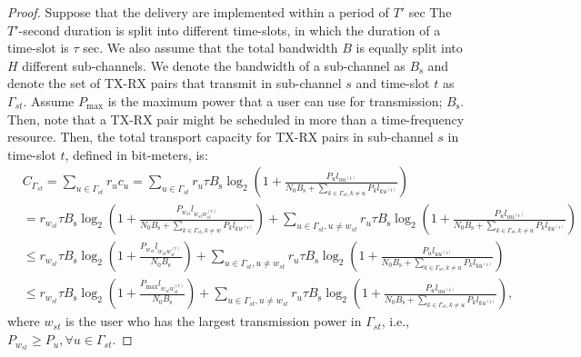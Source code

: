 \documentclass[journal,draftclsnofoot,onecolumn,12pt,twoside]{IEEEtran}
\begin{document}
\begin{proof}
Suppose that the delivery are implemented within a period of $T'$ sec The $T'$-second duration is split into different time-slots, in which the duration of a time-slot is $\tau$ sec. We also assume that the total bandwidth $B$ is equally split into $H$ different sub-channels. We denote the bandwidth of a sub-channel as $B_{\text{s}}$ and denote the set of TX-RX pairs that transmit in sub-channel $s$ and time-slot $t$ as $\Gamma_{st}$. Assume $P_{\text{max}}$ is the maximum power that a user can use for transmission; $B_{\text{s}}$. Then, note that a TX-RX pair might be scheduled in more than a time-frequency resource. Then, the total transport capacity for TX-RX pairs in sub-channel $s$ in time-slot $t$, defined in bit-meters, is:
\begin{equation}
\begin{aligned}\label{eq:g_model_subTC}
&C_{\Gamma_{st}}=\sum_{u\in\Gamma_{st}}r_uc_u=\sum_{u\in\Gamma_{st}}r_u\tau B_{\text{s}}\log_2\left(1+\frac{P_ul_{uu^{(\text{r})}}}{N_0B_{\text{s}}+\sum_{k\in\Gamma_{st},k\neq u}P_kl_{ku^{(\text{r})}}}\right)\\
&=r_{w_{st}}\tau B_{\text{s}}\log_2\left(1+\frac{P_{w_{st}}l_{w_{st}w_{st}^{(\text{r})}}}{N_0B_{\text{s}}+\sum_{k\in\Gamma_{st},k\neq w}P_kl_{kw^{(\text{r})}}}\right)+\sum_{u\in\Gamma_{st},u\neq {w_{st}}}r_u\tau B_{\text{s}}\log_2\left(1+\frac{P_ul_{uu^{(\text{r})}}}{N_0B_{\text{s}}+\sum_{k\in\Gamma_{st},k\neq u}P_kl_{ku^{(\text{r})}}}\right)\\
&\leq r_{w_{st}}\tau B_{\text{s}}\log_2\left(1+\frac{P_{w_{st}}l_{w_{st}w_{st}^{(\text{r})}}}{N_0B_{\text{s}}}\right)+\sum_{u\in\Gamma_{st},u\neq {w_{st}}}r_u\tau B_{\text{s}}\log_2\left(1+\frac{P_ul_{uu^{(\text{r})}}}{N_0B_{\text{s}}+\sum_{k\in\Gamma_{st},k\neq u}P_kl_{ku^{(\text{r})}}}\right)\\
& \leq r_{w_{st}}\tau B_{\text{s}}\log_2\left(1+\frac{P_{\text{max}}l_{w_{st}w_{st}^{(\text{r})}}}{N_0B_{\text{s}}}\right)+\sum_{u\in\Gamma_{st},u\neq {w_{st}}}r_u\tau B_{\text{s}}\log_2\left(1+\frac{P_ul_{uu^{(\text{r})}}}{N_0B_{\text{s}}+\sum_{k\in\Gamma_{st},k\neq u}P_kl_{ku^{(\text{r})}}}\right),
\end{aligned}
\end{equation}
where $w_{st}$ is the user who has the largest transmission power in $\Gamma_{st}$, i.e., $P_{w_{st}}\geq P_u,\forall u\in\Gamma_{st}$.


\end{proof}
\end{document}
